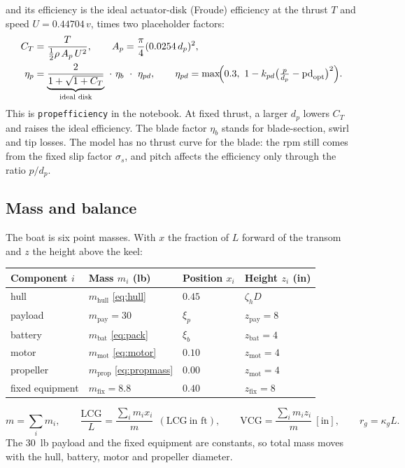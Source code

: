 \documentclass[11pt,a4paper]{article}
\renewcommand{\_}{\textunderscore\allowbreak}
\newcommand{\code}[1]{\texttt{#1}}
\newcommand{\lcg}{\mathrm{LCG}}
\newcommand{\vcg}{\mathrm{VCG}}
\begin{document}
and its efficiency is the ideal actuator-disk (Froude) efficiency at the thrust $T$ and speed $U=0.44704\,v$, times two placeholder factors:
\begin{align}
  C_T &= \frac{T}{\tfrac12\rho\,A_p\,U^2}, \qquad A_p=\frac{\pi}{4}(0.0254\,d_p)^2, \label{eq:propct}\\
  \eta_p &= \underbrace{\frac{2}{1+\sqrt{1+C_T}}}_{\text{ideal disk}}\ \cdot\ \eta_b\ \cdot\ \eta_{pd},
  \qquad \eta_{pd}=\max\!\Bigl(0.3,\ 1-k_{pd}\bigl(\tfrac{p}{d_p}-\mathrm{pd}_{\mathrm{opt}}\bigr)^2\Bigr).
  \label{eq:propeff}
\end{align}
This is \code{prop\_efficiency} in the notebook.
At fixed thrust, a larger $d_p$ lowers $C_T$ and raises the ideal efficiency. The blade factor $\eta_b$ stands for blade-section, swirl and tip losses.
The model has no thrust curve for the blade: the rpm still comes from the fixed slip factor $\sigma_s$, and pitch affects the efficiency only through the ratio $p/d_p$.

\subsection{Mass and balance}
The boat is six point masses. With $x$ the fraction of $L$ forward of the transom and $z$ the height above the keel:

\begin{center}\small
\begin{tabular}{@{}l l l l@{}}
\toprule
Component $i$ & Mass $m_i$ (lb) & Position $x_i$ & Height $z_i$ (in)\\
\midrule
hull    & $m_{\mathrm{hull}}$ \eqref{eq:hull} & $0.45$   & $\zeta_h D$ \\
payload & $m_{\mathrm{pay}}=30$               & $\xi_p$  & $z_{\mathrm{pay}}=8$ \\
battery & $m_{\mathrm{bat}}$ \eqref{eq:pack}  & $\xi_b$  & $z_{\mathrm{bat}}=4$ \\
motor   & $m_{\mathrm{mot}}$ \eqref{eq:motor} & $0.10$   & $z_{\mathrm{mot}}=4$ \\
propeller & $m_{\mathrm{prop}}$ \eqref{eq:propmass} & $0.00$   & $z_{\mathrm{mot}}=4$ \\
fixed equipment & $m_{\mathrm{fix}}=8.8$      & $0.40$   & $z_{\mathrm{fix}}=8$ \\
\bottomrule
\end{tabular}
\end{center}
\begin{equation}
  m = \sum_i m_i, \qquad
  \frac{\lcg}{L} = \frac{\sum_i m_i x_i}{m}\ \ (\lcg\ \text{in ft}), \qquad
  \vcg = \frac{\sum_i m_i z_i}{m}\ [\mathrm{in}], \qquad
  r_g = \kappa_g L.
  \label{eq:balance}
\end{equation}
The 30~lb payload and the fixed equipment are constants, so total mass moves with the hull, battery, motor and propeller diameter.
\end{document}
